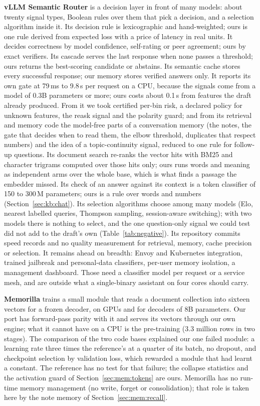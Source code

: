 \textbf{vLLM Semantic Router} \cite{semanticrouter2026} is a decision layer
in front of many models: about twenty signal types, Boolean rules over them
that pick a decision, and a selection algorithm inside it. Its decision rule
is lexicographic and hand-weighted; ours is one rule derived from expected
loss with a price of latency in real units. It decides correctness by model
confidence, self-rating or peer agreement; ours by exact verifiers. Its
cascade serves the last response when none passes a threshold; ours returns
the best-scoring candidate or abstains. Its semantic cache stores every
successful response; our memory stores verified answers only. It reports its
own gate at 79\,ms to 9.8\,s per request on a CPU, because the signals come
from a model of 0.3B parameters or more; ours costs about 0.1\,s from
features the draft already produced. From it we took certified per-bin risk,
a declared policy for unknown features, the reask signal and the polarity
guard; and from its retrieval and memory code the model-free parts of a
conversation memory (the notes, the gate that decides when to read them, the
elbow threshold, duplicates that respect numbers) and the idea of a
topic-continuity signal, reduced to one rule for follow-up questions. Its
document search re-ranks the vector hits with BM25 and character trigrams
computed over those hits only; ours runs words and meaning as independent
arms over the whole base, which is what finds a passage the embedder missed.
Its check of an answer against its context is a token classifier of 150 to
300\,M parameters; ours is a rule over words and numbers
(Section~\ref{sec:kb:chat}). Its selection algorithms choose among many
models (Elo, nearest labelled queries, Thompson sampling, session-aware
switching); with two models there is nothing to select, and the one
question-only signal we could test did not add to the draft's own
(Table~\ref{tab:negative}). Its repository commits speed records and no
quality measurement for retrieval, memory, cache precision or selection. It
remains ahead on breadth: Envoy and Kubernetes integration, trained jailbreak
and personal-data classifiers, per-user memory isolation, a management
dashboard. Those need a classifier model per request or a service mesh, and
are outside what a single-binary assistant on four cores should carry.

\textbf{Memorilla} \cite{memorilla2026} trains a small module that reads a
document collection into sixteen vectors for a frozen decoder, on GPUs and
for decoders of 8B parameters. Our port has forward-pass parity with it and
serves its vectors through our own engine; what it cannot have on a CPU is
the pre-training (3.3 million rows in two stages). The comparison of the two
code bases explained our one failed module: a learning rate three times the
reference's at a quarter of its batch, no dropout, and checkpoint selection
by validation loss, which rewarded a module that had learnt a constant. The
reference has no test for that failure; the collapse statistics and the
activation guard of Section~\ref{sec:mem:tokens} are ours. Memorilla has no
run-time memory management (no write, forget or consolidation); that role is
taken here by the note memory of Section~\ref{sec:mem:recall}.

